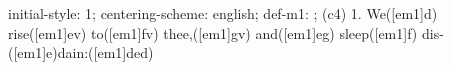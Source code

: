 initial-style: 1;
centering-scheme: english;
def-m1: \grealign;
(c4) 1. We([em1]d) rise([em1]ev) to([em1]fv) thee,([em1]gv) and([em1]eg) sleep([em1]f) dis-([em1]e)dain:([em1]ded)